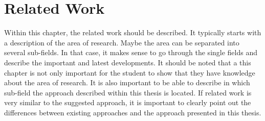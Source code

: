 \chapter{Related Work}
\label{ch:related-work}

Within this chapter, the related work should be described. It typically starts with a description of the area of research. Maybe the area can be separated into several sub-fields. In that case, it makes sense to go through the single fields and describe the important and latest developments. It should be noted that a this chapter is not only important for the student to show that they have knowledge about the area of research. It is also important to be able to describe in which sub-field the approach described within this thesis is located. If related work is very similar to the suggested approach, it is important to clearly point out the differences between existing approaches and the approach presented in this thesis.